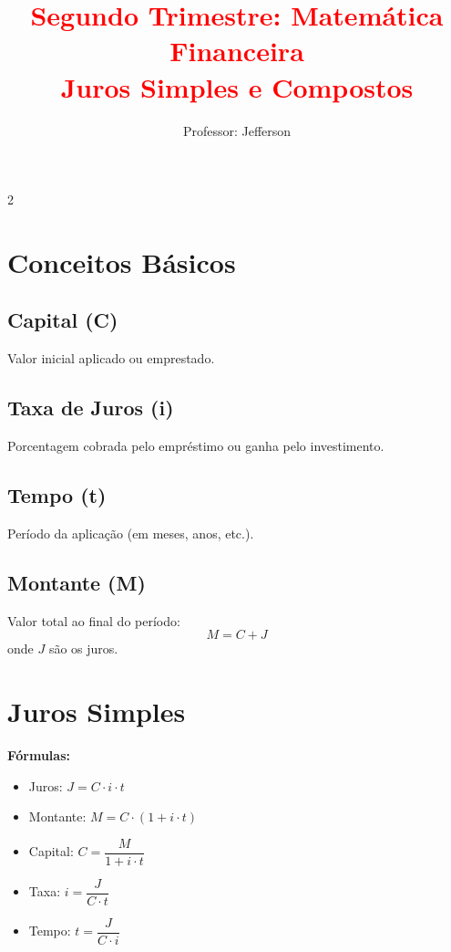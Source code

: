 \documentclass[11pt]{article}
\title{\textcolor{red}{Segundo Trimestre: Matemática Financeira
    \\Juros Simples e Compostos}}
\author{Professor: Jefferson}
\date{}
\begin{document}
\maketitle
\vspace{-1cm}


\begin{multicols}{2}

\section*{Conceitos Básicos}

\subsection*{Capital (C)}
Valor inicial aplicado ou emprestado.

\subsection*{Taxa de Juros (i)}
Porcentagem cobrada pelo empréstimo ou ganha pelo investimento.

\subsection*{Tempo (t)}
Período da aplicação (em meses, anos, etc.).

\subsection*{Montante (M)}
Valor total ao final do período:
\[
M = C + J
\]
onde $J$ são os juros.

\section*{Juros Simples}


\textbf{Fórmulas:}
\begin{itemize}
\item Juros: $J = C \cdot i \cdot t$
\item Montante: $M = C \cdot (1 + i \cdot t)$
\item Capital: $C = \dfrac{M}{1 + i \cdot t}$
\item Taxa: $i = \dfrac{J}{C \cdot t}$
\item Tempo: $t = \dfrac{J}{C \cdot i}$
\end{itemize}


\end{multicols}
\end{document}
